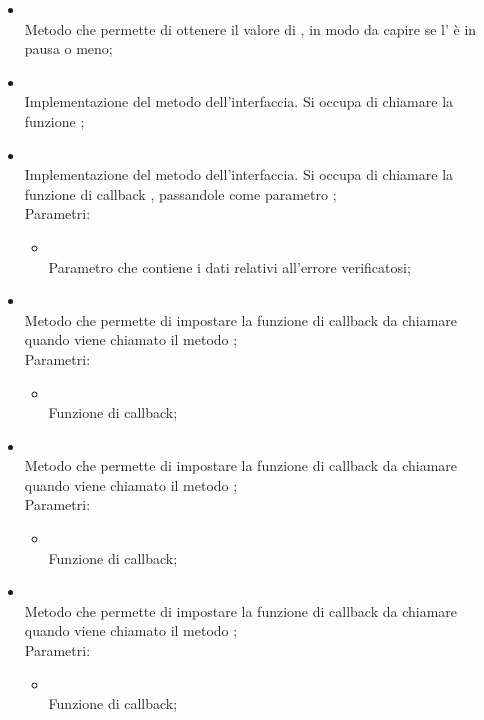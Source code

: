 \begin{itemize}
\begin{itemize}
		\item[]  \\		Metodo che permette di ottenere il valore di , in modo da capire se l' è in pausa o meno;\\
		\item[]  \\		Implementazione del metodo dell'interfaccia. Si occupa di chiamare la funzione ;\\
		\item[]  \\		Implementazione del metodo dell'interfaccia. Si occupa di chiamare la funzione di callback , passandole come parametro ;\\
		Parametri:
		\begin{itemize}
			\item {} \\
			Parametro che contiene i dati relativi all'errore verificatosi;
		\end{itemize}
		\item[]  \\		Metodo che permette di impostare la funzione di callback da chiamare quando viene chiamato il metodo ;\\
		Parametri:
		\begin{itemize}
			\item {} \\
			Funzione di callback;
		\end{itemize}
		\item[]  \\		Metodo che permette di impostare la funzione di callback da chiamare quando viene chiamato il metodo ;\\
		Parametri:
		\begin{itemize}
			\item {} \\
			Funzione di callback;
		\end{itemize}
		\item[]  \\		Metodo che permette di impostare la funzione di callback da chiamare quando viene chiamato il metodo ;\\
		Parametri:
		\begin{itemize}
			\item {} \\
			Funzione di callback;
		\end{itemize}
	\end{itemize}
\end{itemize}
\FloatBarrier

